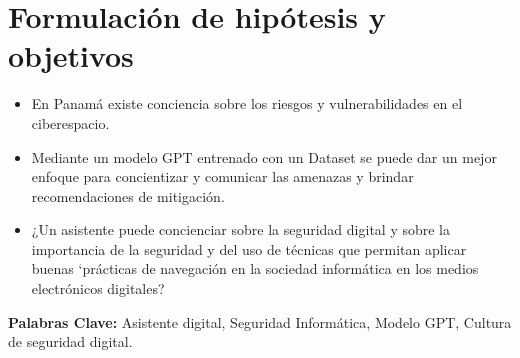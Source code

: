 \section{Formulación de hipótesis y objetivos} \label{section:thesis organization} %

    \begin{itemize}
        \item En Panamá existe conciencia sobre los riesgos y vulnerabilidades en el ciberespacio.
        \item Mediante un modelo GPT entrenado con un Dataset se puede dar un mejor enfoque para concientizar y comunicar las amenazas y brindar recomendaciones de mitigación.
        \item ¿Un asistente puede concienciar sobre la seguridad digital y sobre la importancia de la seguridad y del uso de técnicas que permitan aplicar buenas ‘prácticas de navegación en la sociedad informática en los medios electrónicos digitales?

    \end{itemize}

 {\normalsize \bf Palabras Clave: }
    {\normalsize Asistente digital, Seguridad Informática, Modelo GPT, Cultura de seguridad digital.}


